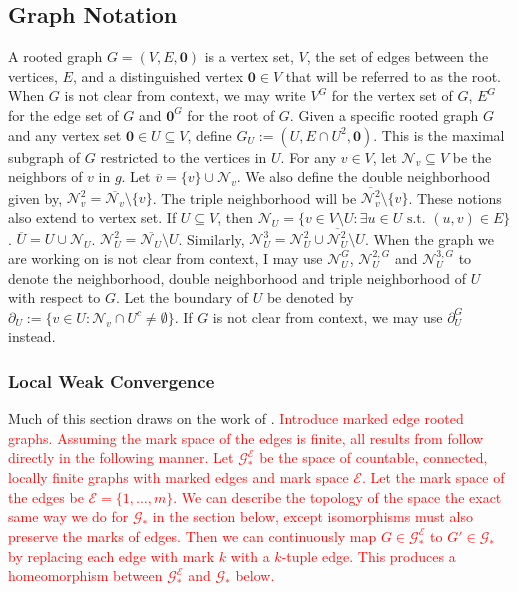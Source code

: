 \documentclass[12pt]{article}
\newcommand{\mc}{\mathcal}
\newcommand{\ov}{\overline}
\newcommand{\te}{\text}
\newcommand{\tr}{\textcolor{red}}
\newcommand{\defeq}{:=}								%
\newcommand{\neigh}[1]{\mc{N}_{#1}}					%
\newcommand{\dneigh}[1]{\mc{N}^2_{#1}}				%
\newcommand{\tneigh}[1]{\mc{N}^3_{#1}}				%
\newcommand{\gneigh}[2]{\mc{N}^{#1}_{#2}}			%
\newcommand{\dgneigh}[2]{\mc{N}^{2,#1}_{#2}}		%
\newcommand{\tgneigh}[2]{\mc{N}^{3,#1}_{#2}}		%
\newcommand{\bdry}[1]{\partial_{#1}}				%
\newcommand{\gbdry}[2]{\partial^{#1}_{#2}}			%
\newcommand{\cl}[1]{\ov{#1}}						%
\renewcommand{\root}{\mathbf{0}}					%
\newcommand{\subg}[1]{_{#1}}						%
\newcommand{\gind}[1]{^{#1}}						%
\newcommand{\Gs}{\mc{G}_\ast}						%
\begin{document}
\subsection{Graph Notation}
\label{not::g}

A rooted graph \(G = (V,E,\root)\) is a vertex set, \(V\), the set of edges between the vertices, \(E\), and a distinguished vertex \(\root \in V\) that will be referred to as the root. When \(G\) is not clear from context, we may write \(V\gind{G}\) for the vertex set of \(G\), \(E\gind{G}\) for the edge set of \(G\) and \(\root\gind{G}\) for the root of \(G\). Given a specific rooted graph \(G\) and any vertex set \(\root \in U \subseteq V\), define \(G\subg{U} \defeq (U,E\cap U^2,\root)\). This is the maximal subgraph of \(G\) restricted to the vertices in \(U\). For any \(v \in V\), let \(\neigh{v}\subseteq V\) be the neighbors of \(v\) in \(g\). Let \(\cl{v} = \{v\}\cup\neigh{v}\). We also define the double neighborhood given by, \(\dneigh{v} = \cl{\neigh{v}}\setminus \{v\}\). The triple neighborhood will be \(\cl{\dneigh{v}} \setminus \{v\}\). These notions also extend to vertex set. If \(U\subseteq V\), then \(\neigh{U} = \{v \in V\setminus U: \exists u \in U\te{ s.t. } (u,v) \in E\}\). \(\cl{U} = U\cup \neigh{U}\). \(\dneigh{U} = \cl{\neigh{U}}\setminus U\). Similarly, \(\tneigh{U} = \dneigh{U} \cup \cl{\dneigh{U}}\setminus U\). When the graph we are working on is not clear from context, I may use \(\gneigh{G}{U}\), \(\dgneigh{G}{U}\) and \(\tgneigh{G}{U}\) to denote the neighborhood, double neighborhood and triple neighborhood of \(U\) with respect to \(G\). Let the boundary of \(U\) be denoted by \(\bdry{U} \defeq \{v \in U: \neigh{v}\cap U^c \neq \emptyset\}\). If \(G\) is not clear from context, we may use \(\gbdry{G}{U}\) instead.

\subsubsection{Local Weak Convergence}
\label{g::lwc}

Much of this section draws on the work of \cite{LacRamWu19}. \tr{Introduce marked edge rooted graphs. Assuming the mark space of the edges is finite, all results from \cite{LacRamWu19} follow directly in the following manner. Let \(\Gs^\mc{E}\) be the space of countable, connected, locally finite graphs with marked edges and mark space \(\mc{E}\). Let the mark space of the edges be \(\mc{E} = \{1,\dots,m\}\). We can describe the topology of the space the exact same way we do for \(\Gs\) in the section below, except isomorphisms must also preserve the marks of edges. Then we can continuously map \(G \in \Gs^\mc{E}\) to \(G' \in \Gs\) by replacing each edge with mark \(k\) with a \(k\)-tuple edge. This produces a homeomorphism between \(\Gs^\mc{E}\) and \(\Gs\) below.}
\end{document}

